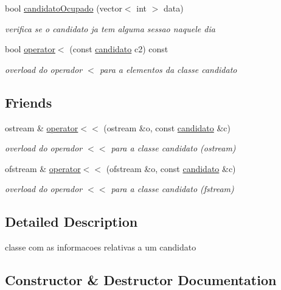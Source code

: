 \begin{DoxyCompactItemize}
bool \hyperlink{classcandidato_aa92f67d09b7cd0449ce2b005267188b9}{candidato\+Ocupado} (vector$<$ int $>$ data)
\begin{DoxyCompactList}\small\item\em verifica se o candidato ja tem alguma sessao naquele dia \end{DoxyCompactList}\item 
bool \hyperlink{classcandidato_a1fd8d1cc3fca3d6bb7eb336e149a85e0}{operator$<$} (const \hyperlink{classcandidato}{candidato} c2) const 
\begin{DoxyCompactList}\small\item\em overload do operador $<$ para a elementos da classe candidato \end{DoxyCompactList}\end{DoxyCompactItemize}
\subsection*{Friends}
\begin{DoxyCompactItemize}
\item 
ostream \& \hyperlink{classcandidato_a8b349878e0149761fba4bccf3c7d5148}{operator$<$$<$} (ostream \&o, const \hyperlink{classcandidato}{candidato} \&c)
\begin{DoxyCompactList}\small\item\em overload do operador $<$$<$ para a classe candidato (ostream) \end{DoxyCompactList}\item 
ofstream \& \hyperlink{classcandidato_ad86b8f19b641b7c48c5c695a8f15f9a2}{operator$<$$<$} (ofstream \&o, const \hyperlink{classcandidato}{candidato} \&c)
\begin{DoxyCompactList}\small\item\em overload do operador $<$$<$ para a classe candidato (fstream) \end{DoxyCompactList}\end{DoxyCompactItemize}


\subsection{Detailed Description}
classe com as informacoes relativas a um candidato 

\subsection{Constructor \& Destructor Documentation}
